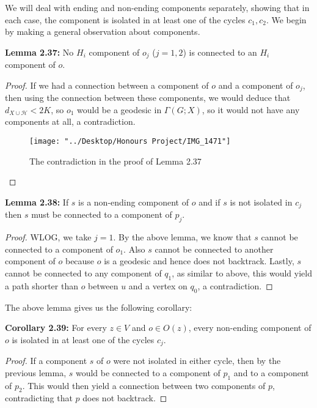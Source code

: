 \documentclass[12pt]{article}
\newcommand{\vs}{\vskip10pt}
\begin{document}
	\vs 
	
	We will deal with ending and non-ending components separately, showing that in each case, the component is isolated in at least one of the cycles $c_1, c_2$. We begin by making a general observation about components.
	
	\vs 
	
	\textbf{Lemma 2.37: } No $H_i$ component of $o_j$ ($j=1,2$) is connected to an $H_i$ component of $o$. 
	
	\begin{proof}
		
		If we had a connection between a component of $o$ and a component of $o_j$, then using the connection between these components, we would deduce that $d_{X \cup \mathcal{H}} < 2K$, so $o_1$ would be a geodesic in $\Gamma(G; X)$, so it would not have any components at all, a contradiction.
		
\begin{figure} [H]
	\centering
	\texttt{[image: "../Desktop/Honours Project/IMG\_1471"]}
	\caption{The contradiction in the proof of Lemma 2.37}
	\label{fig:img1471}
\end{figure}
		
	\end{proof}

	\textbf{Lemma 2.38: } If $s$ is a non-ending component of $o$ and if $s$ is not isolated in $c_j$ then $s$ must be connected to a component of $p_j$. 
	
	\begin{proof}
		
		WLOG, we take $j = 1$. By the above lemma, we know that $s$ cannot be connected to a component of $o_1$. Also $s$ cannot be connected to another component of $o$ because $o$ is a geodesic and hence does not backtrack. Lastly, $s$ cannot be connected to any component of $q_1$, as similar to above, this would yield a path shorter than $o$ between $u$ and a vertex on $q_0$, a contradiction.
		
	\end{proof}

	The above lemma gives us the following corollary: 
	
	\vs 
	
	\textbf{Corollary 2.39: } For every $z \in V$ and $o \in O(z)$, every non-ending component of $o$ is isolated in at least one of the cycles $c_j$. 
	
	\begin{proof}
		
		If a component $s$ of $o$ were not isolated in either cycle, then by the previous lemma, $s$ would be connected to a component of $p_1$ and to a component of $p_2$. This would then yield a connection between two components of $p$, contradicting that $p$ does not backtrack. 
		
	\end{proof}
\end{document}
